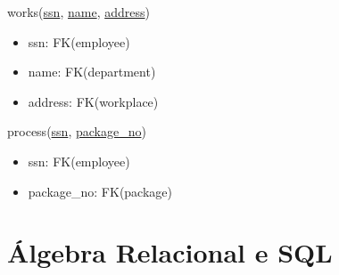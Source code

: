 \documentclass[12pt,a4paper]{article}
\begin{document}
\vspace*{10pt}
\noindent
works(\underline{ssn}, \underline{name}, \underline{address})
\begin{itemize}[nosep]
    \item ssn: FK(employee)
    \item name: FK(department)
    \item address: FK(workplace)
\end{itemize}

\vspace*{10pt}
\noindent
process(\underline{ssn}, \underline{package\_no})
\begin{itemize}[nosep]
    \item ssn: FK(employee)
    \item package\_no: FK(package)
\end{itemize}

\vspace*{15pt}

\section*{Álgebra Relacional e SQL}
\end{document}
